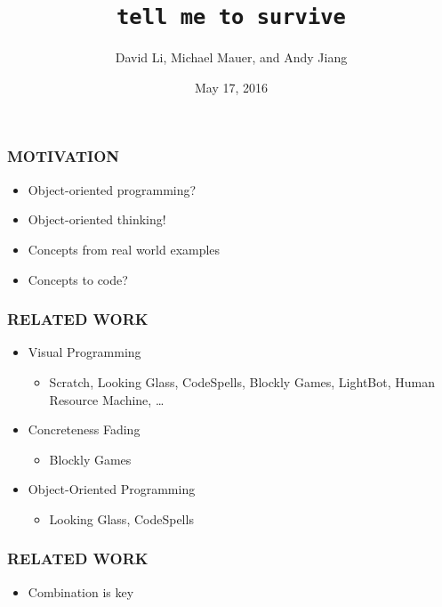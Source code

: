 \documentclass{beamer}
\title{\texttt{tell me to survive}}
\author{David Li, Michael Mauer, and Andy Jiang}
\institute{Cornell University}
\date{May 17, 2016}
\let\theframetitle\frametitle
\renewcommand\frametitle[1]{\theframetitle{\MakeUppercase{#1}}}
\begin{document}
\frame{\titlepage}

\begin{frame}
\frametitle{Motivation}


\begin{itemize}[<+->]
\item Object-oriented programming?
\item Object-oriented thinking!
\item Concepts from real world examples
\item Concepts to code?
\end{itemize}
\end{frame}

\begin{frame}
\frametitle{Related Work}
\begin{itemize}
\item<1-> Visual Programming
  \begin{itemize}
  \item Scratch, Looking Glass, CodeSpells, Blockly Games, LightBot,
    Human Resource Machine, …
  \end{itemize}
\item<2-> Concreteness Fading
  \begin{itemize}
  \item Blockly Games
  \end{itemize}
\item<3-> Object-Oriented Programming
  \begin{itemize}
  \item Looking Glass, CodeSpells
  \end{itemize}
\end{itemize}
\end{frame}

\begin{frame}
\frametitle{Related Work}
\begin{itemize}[<+->]
\item Combination is key
\end{itemize}
\end{frame}
\end{document}
